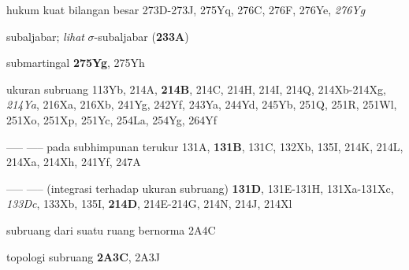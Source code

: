 hukum kuat bilangan besar
273D-273J, 
275Yq, 276C, 276F, 276Ye, {\it 276Yg}








































subaljabar;  
  {\it lihat} 
$\sigma$-subaljabar ({\bf 233A})
















submartingal {\bf 275Yg}, 275Yh













ukuran subruang 113Yb,
  214A, {\bf 214B}, 214C, 214H, 214I, 214Q,
214Xb-214Xg, 
{\it 214Ya}, 216Xa, 216Xb, 241Yg, 242Yf, 243Ya, 244Yd,
245Yb, 251Q, 251R, 251Wl, 251Xo, 251Xp, 251Yc, 254La, 254Yg, 264Yf  

----- -----  pada subhimpunan terukur 131A, {\bf 131B}, 131C, 132Xb,
135I,
  214K, 214L, 214Xa, 214Xh, 241Yf, 247A  

----- -----  (integrasi terhadap ukuran subruang) {\bf 131D},
131E-131H, 
131Xa-131Xc, 
{\it 133Dc}, 133Xb, 135I,
  {\bf 214D}, 214E-214G, 
214N, 214J, 214Xl

subruang dari suatu ruang bernorma 2A4C


topologi subruang {\bf 2A3C}, 2A3J




